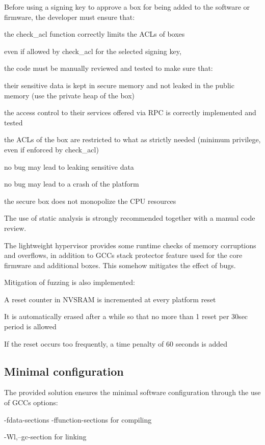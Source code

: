 Before using a signing key to approve a box for being added to the software or firmware, the developer must ensure that\+:
\begin{DoxyItemize}
\item the check\+\_\+acl function correctly limits the A\+C\+Ls of boxes
\item even if allowed by check\+\_\+acl for the selected signing key,
\item the code must be manually reviewed and tested to make sure that\+:
\begin{DoxyItemize}
\item their sensitive data is kept in secure memory and not leaked in the public memory (use the private heap of the box)
\item the access control to their services offered via R\+PC is correctly implemented and tested
\item the A\+C\+Ls of the box are restricted to what as strictly needed (minimum privilege, even if enforced by check\+\_\+acl)
\item no bug may lead to leaking sensitive data
\item no bug may lead to a crash of the platform
\item the secure box does not monopolize the C\+PU resources
\end{DoxyItemize}
\end{DoxyItemize}

The use of static analysis is strongly recommended together with a manual code review.

The lightweight hypervisor provides some runtime checks of memory corruptions and overflows, in addition to G\+CC\textquotesingle{}s stack protector feature used for the core firmware and additional boxes. This somehow mitigates the effect of bugs.

Mitigation of fuzzing is also implemented\+:
\begin{DoxyItemize}
\item A reset counter in N\+V\+S\+R\+AM is incremented at every platform reset
\item It is automatically erased after a while so that no more than 1 reset per 30sec period is allowed
\item If the reset occurs too frequently, a time penalty of 60 seconds is added
\end{DoxyItemize}\hypertarget{_p_c_i_g_u_i_d_a_n_c_e_sub_minconf}{}\subsection{Minimal configuration}\label{_p_c_i_g_u_i_d_a_n_c_e_sub_minconf}
The provided solution ensures the minimal software configuration through the use of G\+CC\textquotesingle{}s options\+:
\begin{DoxyItemize}
\item -\/fdata-\/sections -\/ffunction-\/sections for compiling
\item -\/\+Wl,--gc-\/section for linking
\end{DoxyItemize}

